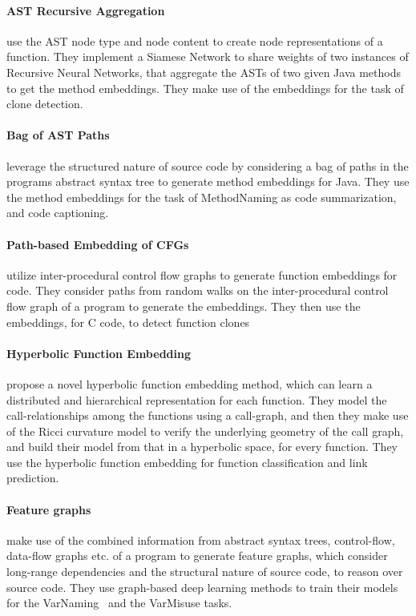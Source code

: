 \documentclass[sigplan,review,anonymous]{acmart}\settopmatter{printfolios=true,printccs=false,printacmref=false}
\begin{document}
\paragraph*{AST Recursive Aggregation}
\citet{buch2019learning} use the AST node type and node content to create node representations of a function. They implement a Siamese Network to share weights of two instances of Recursive Neural Networks, that aggregate the ASTs of two given Java methods to get the method embeddings. They make use of the embeddings for the task of clone detection.

\paragraph*{Bag of AST Paths}
\citet{DBLP:journals/corr/abs-1803-09544, DBLP:journals/corr/abs-1808-01400} leverage the structured nature of source code by considering a bag of paths in the programs abstract syntax tree to generate method embeddings for Java. They use the method embeddings for the task of MethodNaming as code summarization, and code captioning.

\paragraph*{Path-based Embedding of CFGs} \citet{DBLP:journals/corr/abs-1802-07779} utilize inter-procedural control flow graphs to generate function embeddings for code. They consider paths from random walks on the inter-procedural control flow graph of a program to generate the embeddings. They then use the embeddings, for C code, to detect function clones

\paragraph*{Hyperbolic Function Embedding}
\citet{HyperbolicFuncEMBED} propose a novel hyperbolic function embedding method, which can learn a distributed and hierarchical representation for each function. They model the call-relationships among the functions using a call-graph, and then they make use of the Ricci curvature model to verify the underlying geometry of the call graph, and build their model from that in a hyperbolic space, for every function. They use the hyperbolic function embedding for function classification and link prediction.

\paragraph*{Feature graphs} \citet{DBLP:journals/corr/abs-1711-00740} make use of the combined information from abstract syntax trees, control-flow, data-flow graphs etc. of a program to generate feature graphs, which consider long-range dependencies and the structural nature of source code, to reason over source code. They use graph-based deep learning methods to train their models for the VarNaming~\citep{DBLP:journals/corr/AllamanisBS14} and the VarMisuse tasks.
\end{document}
